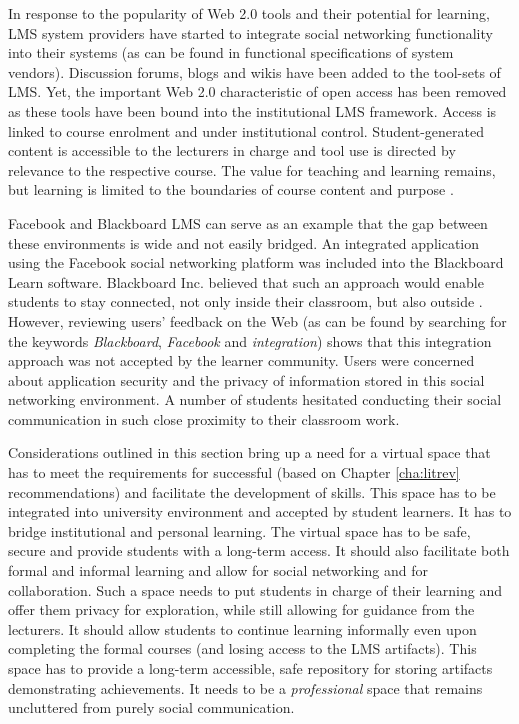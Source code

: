 In response to the popularity of Web 2.0 tools and their potential for learning,
LMS system providers have started to integrate social networking functionality
into their systems (as can be found in functional specifications of system
vendors). Discussion forums, blogs and wikis have been added to the tool-sets of
LMS. Yet, the important Web 2.0 characteristic of open access has been removed
as these tools have been bound into the institutional LMS framework. Access is
linked to course enrolment and under institutional control. Student-generated
content is accessible to the lecturers in charge and tool use is directed by
relevance to the respective course. The value for teaching and learning remains,
but learning is limited to the boundaries of course content and purpose
\citep{Mott2010}.

Facebook and Blackboard LMS can serve as an example that the gap between
these environments is wide and not easily bridged. An integrated application
using the Facebook social networking platform was included into the Blackboard
Learn software. Blackboard Inc. believed that such an approach would enable
students to stay connected, not only inside their classroom, but also outside
\citep{BlackboardInc.2009}. However, reviewing users' feedback on the Web (as
can be found by searching for the keywords \textit{Blackboard},
\textit{Facebook} and \textit{integration}) shows that this integration approach
was not accepted by the learner community. Users were concerned about
application security and the privacy of information stored in this social
networking environment. A number of students hesitated conducting their social
communication in such close proximity to their classroom work. 

Considerations outlined in this section bring up a need for a virtual space that
has to meet the requirements for successful \LLLs (based on Chapter
\ref{cha:litrev} recommendations) and facilitate the development of \LLLs
skills. This space has to be integrated into university environment and
accepted by student learners. It has to bridge institutional and personal
learning. The virtual space has to be safe, secure and provide students with a
long-term access. It should also facilitate both formal and informal learning
and allow for social networking and for collaboration. Such a space needs to put
students in charge of their learning and offer them privacy for exploration,
while still allowing for guidance from the lecturers. It should allow students
to continue learning informally even upon completing the formal courses (and
losing access to the LMS artifacts). This space has to provide a long-term
accessible, safe repository for storing artifacts demonstrating achievements. It
needs to be a \textit{professional} space that remains uncluttered from purely
social communication.

